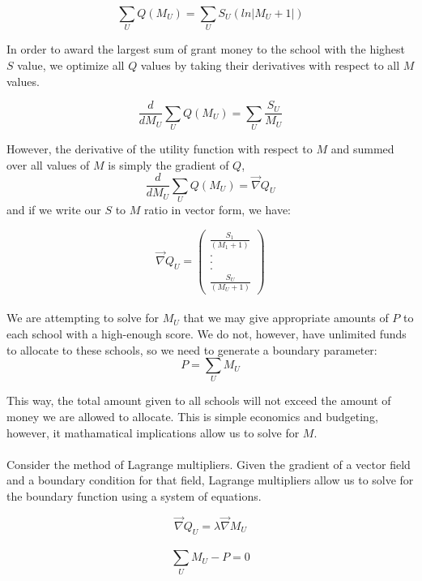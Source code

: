 \documentclass[paper.tex]{subfiles}
\begin{document}
	$$ \sum_{U} Q(M_{U})  = \sum_{U} S_{U}(ln|M_{U}+1|)  $$
	
	In order to award the largest sum of grant money to the school with the highest $S$ value, we optimize all $Q$ values by taking their derivatives with respect to all $M$ values.
	
	$$ \frac{d}{dM_{U}} \sum_{U}Q(M_{U})  = \sum_{U}\frac{S_{U}}{M_{U}} $$
	
	However, the derivative of the utility function with respect to $M$ and summed over all values of $M$ is simply the gradient of $Q$,
	$$ \frac{d}{dM_{U}} \sum_{U}Q(M_{U}) = \vec{\nabla} Q_{U}   $$
	and if we write our $S$ to $M$ ratio in vector form, we have:
	 
	$$ \vec{\nabla} Q_{U} =  \left( \begin{array}{c}
	\frac{S_{1}}{(M_{1}+1)} \\
	. \\
	.\\
	.\\
	\frac{S_{U}}{(M_{U}+1)}  \end{array} \right) $$
	\\
	
	We are attempting to solve for $M_{U}$ that we may give appropriate amounts of $P$ to each school with a high-enough score. We do not, however, have unlimited funds to allocate to these schools, so we need to generate a boundary parameter:
	$$ P = \sum_{U} M_{U}   $$
	
	This way, the total amount given to all schools will not exceed the amount of money we are allowed to allocate. This is simple economics and budgeting, however, it mathamatical implications allow us to solve for $M$. 
	\\\\
	Consider the method of Lagrange multipliers. Given the gradient of a vector field and a boundary condition for that field, Lagrange multipliers allow us to solve for the boundary function using a system of equations.
	
		$$\vec{\nabla} Q_{U} = \lambda \vec{\nabla} M_{U}$$\\ $$\sum_{U} M_{U} - P = 0$$ 
 	
	
\end{document}
